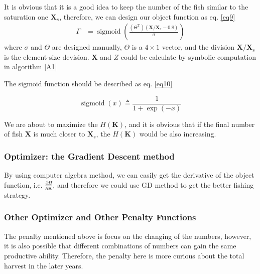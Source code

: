 \documentclass{IEEEtran}
\DeclareMathOperator*{\sigmoid}{sigmoid}
\begin{document}
It is obvious that it is a good idea to keep the number of the fish similar to the saturation one $\bm X_s$, therefore, we can design our object function as eq. \ref{eq9}
\begin{align}
    \label{eq9}
    \Gamma &= \sigmoid(\frac{(\Theta^\mathrm T)(\bm X / \bm X_s - 0.8)}{\sigma})
\end{align}
where $\sigma$ and $\Theta$ are designed manually, $\Theta$ is a $4 \times 1$ vector, and the division $\bm X / \bm X_s$ is the element-size devision. $\bm X$ and $Z$ could be calculate by symbolic computation in algorithm \ref{A1}

The sigmoid function should be described as eq. \ref{eq10}

\begin{equation}
    \label{eq10}
    \sigmoid(x) \triangleq \frac1{1 + \exp(-x)}
\end{equation}

We are about to maximize the $H(\bm K)$, and it is obvious that if the final number of fish $\bm X$ is much closer to $\bm X_s$, the $H(\bm K)$ would be also increasing.

\subsubsection{Optimizer: the Gradient Descent method}

By using computer algebra method, we can easily get the derivative of the object function, i.e. $\frac{\partial H}{\partial \bm K}$, and therefore we could use GD method to get the better fishing strategy.

%
%

\subsubsection{Other Optimizer and Other Penalty Functions}

The penalty mentioned above is focus on the changing of the numbers, however, it is also possible that different combinations of numbers can gain the same productive ability. Therefore, the penalty here is more curious about the total harvest in the later years.
\end{document}
